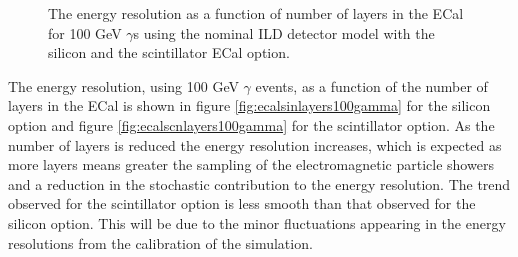 \begin{figure}
\centering
{}
\caption[The energy resolution as a function of number of layers in the ECal for 100 GeV $\gamma$s using the nominal ILD detector model with \protect{} the silicon and \protect{} the scintillator ECal option.]{The energy resolution as a function of number of layers in the ECal for 100 GeV $\gamma$s using the nominal ILD detector model with \protect{} the silicon and \protect{} the scintillator ECal option.}
\label{fig:ecalnlayersgamma}
\end{figure}

The energy resolution, using 100 GeV $\gamma$ events, as a function of the number of layers in the ECal is shown in figure \ref{fig:ecalsinlayers100gamma} for the silicon option and figure \ref{fig:ecalscnlayers100gamma} for the scintillator option.  As the number of layers is reduced the energy resolution increases, which is expected as more layers means greater the sampling of the electromagnetic particle showers and a reduction in the stochastic contribution to the energy resolution.  The trend observed for the scintillator option is less smooth than that observed for the silicon option.  This will be due to the minor fluctuations appearing in the energy resolutions from the calibration of the simulation.   

